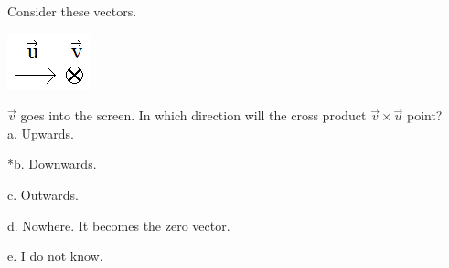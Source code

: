 
Consider these vectors.

\includegraphics[width=0.95847in,height=0.64592in]{../../Images/VectorsQ8.png} 

\(\overrightarrow{v}\) goes into the screen. In which direction will the cross product \(\overrightarrow{v} \times \overrightarrow{u}\) point? \\

a. Upwards.

*b. Downwards.

c. Outwards.

d. Nowhere. It becomes the zero vector.

e. I do not know. \\
